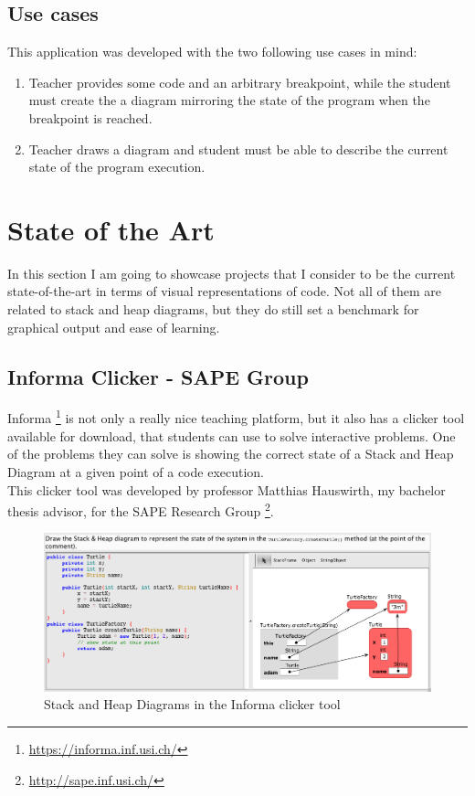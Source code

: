 \documentclass[]{usiinfbachelorproject}
\begin{document}
\subsection{Use cases}

This application was developed with the two following use cases in mind:

\begin{enumerate}
\item Teacher provides some code and an arbitrary breakpoint, while the student must create the a diagram mirroring the state of the program when the breakpoint is reached.
\item Teacher draws a diagram and student must be able to describe the current state of the program execution.
\end{enumerate}

\vspace{\fill}

\pagebreak

\section{State of the Art} \label{state}

In this section I am going to showcase projects that I consider to be the current state-of-the-art in terms of visual representations of code. Not all of them are related to stack and heap diagrams, but they do still set a benchmark for graphical output and ease of learning.

\subsection{Informa Clicker - SAPE Group}

\noindent Informa \footnote{\url{https://informa.inf.usi.ch/}} is not only a really nice teaching platform, but it also has a clicker tool available for download, that students can use to solve interactive problems. One of the problems they can solve is showing the correct state of a Stack and Heap Diagram at a given point of a code execution.\\

\noindent This clicker tool was developed by professor Matthias Hauswirth, my bachelor thesis advisor, for the SAPE Research Group \footnote{\url{http://sape.inf.usi.ch/}}.

\begin{figure}[h!]
\includegraphics[scale=0.4]{figures/informa_clicker.png}
\centering
\caption {Stack and Heap Diagrams in the Informa clicker tool}
\end{figure}
\end{document}
